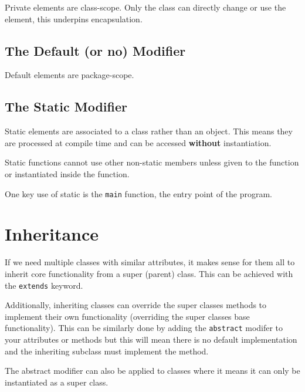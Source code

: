 \documentclass[a4paper, 12pt, twoside]{article}
\begin{document}
Private elements are class-scope. Only the class can directly
change or use the element, this underpins encapsulation.

\subsection{The Default (or no) Modifier}

Default elements are package-scope.

\subsection{The Static Modifier}

Static elements are associated to a class rather than an object.
This means they are processed at compile time and can be accessed
\textbf{without} instantiation.

\vspace{\baselineskip}

Static functions cannot use other non-static members unless given
to the function or instantiated inside the function.

\vspace{\baselineskip}

One key use of static is the \texttt{main} function, the entry point
of the program.

\section{Inheritance}

If we need multiple classes with similar attributes, it makes sense
for them all to inherit core functionality from a super (parent) class.
This can be achieved with the \texttt{extends} keyword.

\vspace{\baselineskip}

Additionally, inheriting classes can override the super classes methods
to implement their own functionality (overriding the super classes
base functionality). This can be similarly done by adding the
\texttt{abstract} modifer to your attributes or methods but this will
mean there is no default implementation and the inheriting subclass
must implement the method.

\vspace{\baselineskip}

The abstract modifier can also be applied to classes where it means
it can only be instantiated as a super class.
\end{document}
